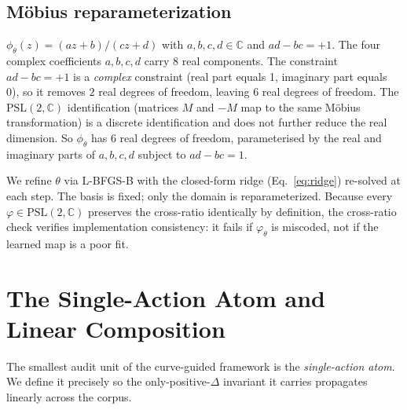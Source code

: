 \documentclass[11pt,a4paper]{article}
\begin{document}
\subsection{M\"obius reparameterization}
\label{sec:mobius}
$\phi_\theta(z) = (az+b)/(cz+d)$ with $a,b,c,d \in \mathbb{C}$ and $ad-bc=+1$. The four complex coefficients $a,b,c,d$ carry $8$ real components. The constraint $ad-bc=+1$ is a \emph{complex} constraint (real part equals 1, imaginary part equals 0), so it removes $2$ real degrees of freedom, leaving $6$ real degrees of freedom. The $\mathrm{PSL}(2,\mathbb{C})$ identification (matrices $M$ and $-M$ map to the same M\"obius transformation) is a discrete identification and does not further reduce the real dimension. So $\phi_\theta$ has $6$ real degrees of freedom, parameterised by the real and imaginary parts of $a,b,c,d$ subject to $ad-bc=1$.

We refine $\theta$ via L-BFGS-B with the closed-form ridge (Eq.~\ref{eq:ridge}) re-solved at each step. The basis is fixed; only the domain is reparameterized. Because every $\varphi \in \mathrm{PSL}(2,\mathbb{C})$ preserves the cross-ratio identically by definition, the cross-ratio check verifies implementation consistency: it fails if $\varphi_\theta$ is miscoded, not if the learned map is a poor fit.

\section{The Single-Action Atom and Linear Composition}
\label{sec:atom}

The smallest audit unit of the curve-guided framework is the \emph{single-action atom}. We define it precisely so the only-positive-$\Delta$ invariant it carries propagates linearly across the corpus.
\end{document}
